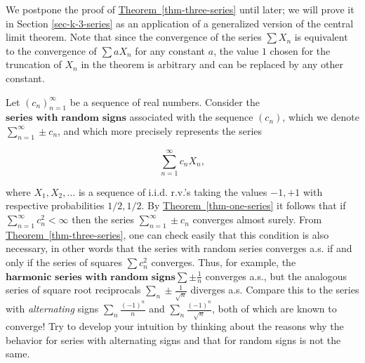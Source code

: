 \noindent We postpone the proof of \hyperref[thm-three-series]{Theorem~\ref*{thm-three-series}}
until later; we will prove it in Section
\ref{sec-k-3-series} as an application of a generalized
version of the central limit theorem. Note that since
the convergence of the series $\sum X_n$ is
equivalent to the convergence of $\sum a X_n$ for any
constant $a$, the value $1$ chosen for the truncation
of $X_n$ in the theorem is arbitrary and can be
replaced by any other constant.

\begin{example}
Let $(c_n)_{n=1}^\infty$ be a sequence of real
numbers. Consider the
$\textbf{series with random signs}$ associated with
the sequence $(c_n)$, which we denote
$\sum_{n=1}^\infty \pm c_n$, and which more precisely
represents the series

\[
\sum_{n=1}^\infty c_n X_n,
\]

\noindent where $X_1, X_2, \ldots$ is a sequence of i.i.d.
r.v.'s taking the values $-1,+1$ with respective
probabilities $1/2,1/2$. By \hyperref[thm-one-series]{Theorem~\ref*{thm-one-series}}
it follows that if $\sum_{n=1}^\infty c_n^2 < \infty$
then the series $\sum_{n=1}^\infty \pm c_n$ converges
almost surely. From \hyperref[thm-three-series]{Theorem~\ref*{thm-three-series}}, one
can check easily that this condition is also
necessary, in other words that the series with random
series converges a.s. if and only if the series of
squares $\sum c_n^2$ converges. Thus, for example,
the $\textbf{harmonic series with random signs}$$\sum \pm \frac{1}{n}$ converges a.s., but the
analogous series of square root reciprocals
$\sum_n \pm \frac{1}{\sqrt{n}}$ diverges a.s. Compare
this to the series with \emph{alternating} signs
$\sum_n \frac{(-1)^n}{n}$ and
$\sum_n \frac{(-1)^n}{\sqrt{n}}$, both of which are
known to converge! Try to develop your intuition by
thinking about the reasons why the behavior for series
with alternating signs and that for random signs is
not the same.
\end{example}
